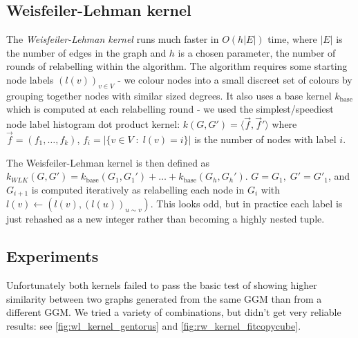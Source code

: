 \subsection{Weisfeiler-Lehman kernel}
The \textit{Weisfeiler-Lehman kernel} runs much faster in $O(h|E|)$ time, where $|E|$ is the number of edges in the graph and $h$ is a chosen parameter, the number of rounds of relabelling within the algorithm. The algorithm requires some starting node labels $(l(v))_{v \in V}$ - we colour nodes into a small discreet set of colours by grouping together nodes with similar sized degrees. It also uses a base kernel $k_{\text{base}}$ which is computed at each relabelling round  - we used the simplest/speediest node label histogram dot product kernel: $k(G, G') = \langle \vec{f}, \vec{f}' \rangle$ where $\vec{f} = (f_1, \dots, f_k)$, $f_i = |\{ v \in V \;:\; l(v) = i\}|$ is the number of nodes with label $i$.

The Weisfeiler-Lehman kernel is then defined as $k_{WLK}(G, G') = k_{\text{base}}(G_1, G_1') + \dots + k_{\text{base}}(G_h, G_h')$. $G=G_1,\; G' = G'_1$, and $G_{i+1}$ is computed iteratively as relabelling each node in $G_i$ with $l(v) \gets (l(v), (l(u))_{u \sim v})$. This looks odd, but in practice each label is just rehashed as a new integer rather than becoming a highly nested tuple.



\subsection{Experiments}

Unfortunately both kernels failed to pass the basic test of showing higher similarity between two graphs generated from the same GGM than from a different GGM. We tried a variety of combinations, but didn't get very reliable results: see \cref{fig:wl_kernel_gentorus} and \cref{fig:rw_kernel_fitcopycube}.


